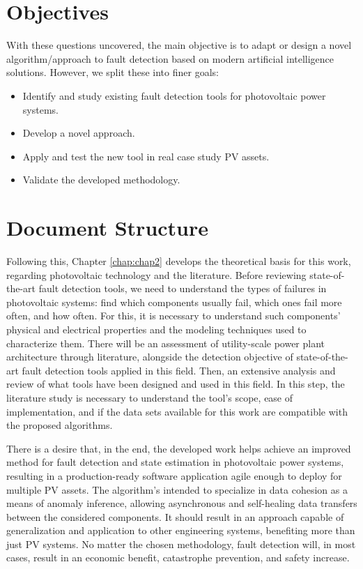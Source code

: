 \section{Objectives}

With these questions uncovered, the main objective is to adapt or design a novel algorithm/approach to fault detection based on modern artificial intelligence solutions. However, we split these into finer goals:

\begin{itemize}
    \item  Identify and study existing fault detection tools for photovoltaic
    power systems.
    \item  Develop a novel approach.
    \item Apply and test the new tool in real case study PV assets.
    \item Validate the developed methodology.
\end{itemize}

\section{Document Structure}

Following this, Chapter \ref{chap:chap2} develops the theoretical basis for this work, regarding photovoltaic technology and the literature. 
Before reviewing state-of-the-art fault detection tools, we need to understand the types of failures in photovoltaic systems: find which components usually fail, which ones fail more often, and how often. For this, it is necessary to understand such components' physical and electrical properties and the modeling techniques used to characterize them. There will be an assessment of utility-scale power plant architecture through literature, alongside the detection objective of state-of-the-art fault detection tools applied in this field. Then, an extensive analysis and review of what tools have been designed and used in this field. In this step, the literature study is necessary to understand the tool's scope, ease of implementation, and if the data sets available for this work are compatible with the proposed algorithms.

There is a desire that, in the end, the developed work helps achieve an improved method for fault detection and state estimation in photovoltaic power systems, resulting in a production-ready software application agile enough to deploy for multiple PV assets. The algorithm's intended to specialize in data cohesion as a means of anomaly inference, allowing asynchronous and self-healing data transfers between the considered components. It should result in an approach capable of generalization and application to other engineering systems, benefiting more than just PV systems. No matter the chosen methodology, fault detection will, in most cases, result in an economic benefit, catastrophe prevention, and safety increase.


